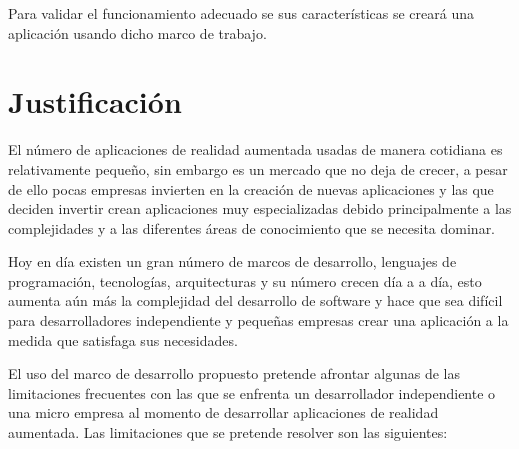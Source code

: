 \documentclass[12pt,a4paper,spanish,openany]{book}
\begin{document}
Para validar el funcionamiento adecuado se sus características se creará una
aplicación usando dicho marco de trabajo.


\section{Justificación}

El número de aplicaciones de realidad aumentada usadas de manera cotidiana es
relativamente pequeño, sin embargo es un mercado que no deja de crecer, a pesar
de ello pocas empresas invierten en la creación de nuevas aplicaciones y las
que deciden invertir crean aplicaciones muy especializadas debido
principalmente a las complejidades y a las diferentes áreas de conocimiento
que se necesita dominar.

Hoy en día existen un gran número de marcos de desarrollo, lenguajes de
programación, tecnologías, arquitecturas y su número crecen día a a día, esto
aumenta aún más la complejidad del desarrollo de software y hace que sea difícil
para desarrolladores independiente y pequeñas empresas crear una aplicación a la
medida que satisfaga sus necesidades.

El uso del marco de desarrollo propuesto pretende afrontar algunas de las
limitaciones frecuentes con las que se enfrenta un desarrollador independiente o
una micro empresa al momento de desarrollar aplicaciones de realidad aumentada.
Las limitaciones que se pretende resolver son las siguientes:
\end{document}

